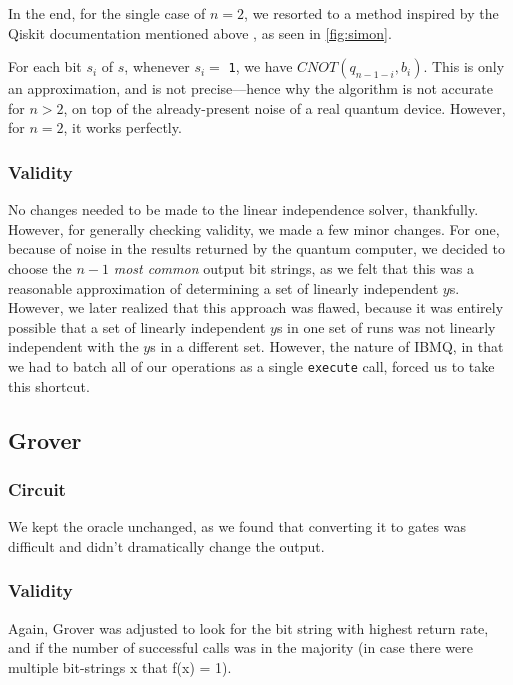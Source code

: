 \documentclass[12pt]{article}
\begin{document}
In the end, for the single case of $n = 2$, we resorted to a method inspired by the Qiskit documentation mentioned above \cite{qiskitsimon}, as seen in \autoref{fig:simon}.


    For each bit $s_i$ of $s$, whenever $s_i = $ \texttt{1}, we have $CNOT(q_{n-1-i}, b_i)$.
    This is only an approximation, and is not precise---hence why the algorithm is not accurate for $n > 2$, on top of the already-present noise of a real quantum device.
    However, for $n=2$, it works perfectly.

\subsubsection*{Validity}

No changes needed to be made to the linear independence solver, thankfully.
However, for generally checking validity, we made a few minor changes.
For one, because of noise in the results returned by the quantum computer, we decided to choose the $n-1$ \textit{most common} output bit strings, as we felt that this was a reasonable approximation of determining a set of linearly independent $y$s.
However, we later realized that this approach was flawed, because it was entirely possible that a set of linearly independent $y$s in one set of runs was not linearly independent with the $y$s in a different set.
However, the nature of IBMQ, in that we had to batch all of our operations as a single \texttt{execute} call, forced us to take this shortcut.

\subsection{Grover}

\subsubsection*{Circuit}
We kept the oracle unchanged, as we found that converting it to gates was difficult and didn’t dramatically change the output.

\subsubsection*{Validity}
Again, Grover was adjusted to look for the bit string with highest return rate, and if the number of successful calls was in the majority (in case there were multiple bit-strings x that f(x) = 1).
\end{document}
